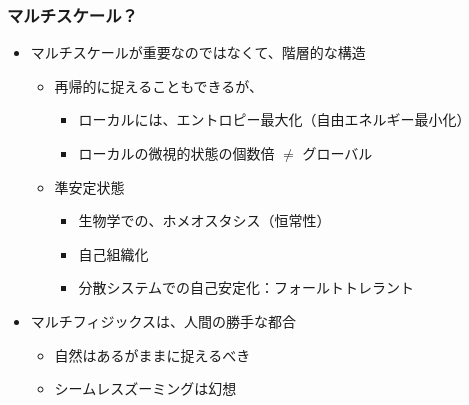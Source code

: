 \documentclass[12pt, dvipdfmx]{beamer}
\begin{document}
\begin{frame}
    \frametitle{マルチスケール？}
    \begin{itemize}
        \item マルチスケールが重要なのではなくて、階層的な構造
        \begin{itemize}
            \item 再帰的に捉えることもできるが、
            \begin{itemize}
                \item ローカルには、エントロピー最大化（自由エネルギー最小化）
                \item ローカルの微視的状態の個数倍 $\neq$ グローバル
            \end{itemize}
            \item 準安定状態
            \begin{itemize}
                \item 生物学での、ホメオスタシス（恒常性）
                \item 自己組織化
                \item 分散システムでの自己安定化：フォールトトレラント
            \end{itemize}
        \end{itemize}
        \item マルチフィジックスは、人間の勝手な都合
        \begin{itemize}
            \item 自然はあるがままに捉えるべき
            \item シームレスズーミングは幻想
        \end{itemize}
    \end{itemize}
\end{frame}
\end{document}
